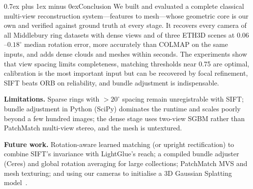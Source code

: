 \documentclass[conference,11pt]{IEEEtran}
\makeatletter
\def\section{\@startsection{section}{1}{\z@}{1.5ex plus 1.5ex minus 0.5ex}%
{0.7ex plus 1ex minus 0ex}{\normalfont\large\bfseries\centering\scshape}}
\makeatother
\begin{document}
\section{Conclusion}
We built and evaluated a complete classical multi-view reconstruction system---features to mesh---whose geometric core is our own and verified against ground truth at every stage. It recovers every camera of all Middlebury ring datasets with dense views and of three ETH3D scenes at $0.06$--$0.18^\circ$ median rotation error, more accurately than COLMAP on the same inputs, and adds dense clouds and meshes within seconds. The experiments show that view spacing limits completeness, matching thresholds near 0.75 are optimal, calibration is the most important input but can be recovered by focal refinement, SIFT beats ORB on reliability, and bundle adjustment is indispensable.

\textbf{Limitations.} Sparse rings with $>20^\circ$ spacing remain unregistrable with SIFT; bundle adjustment in Python (SciPy) dominates the runtime and scales poorly beyond a few hundred images; the dense stage uses two-view SGBM rather than PatchMatch multi-view stereo, and the mesh is untextured.

\textbf{Future work.} Rotation-aware learned matching (or upright rectification) to combine SIFT's invariance with LightGlue's reach; a compiled bundle adjuster (Ceres) and global rotation averaging for large collections; PatchMatch MVS and mesh texturing; and using our cameras to initialise a 3D Gaussian Splatting model~\cite{kerbl2023gaussian}.


\end{document}
